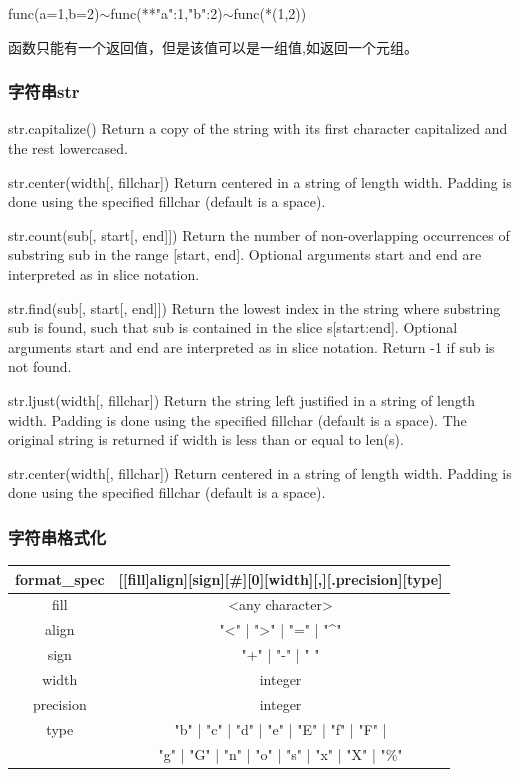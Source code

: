 \documentclass[5pt,a4paper,twocolumn]{article}
\begin{document}
func(a=1,b=2)$\sim$func(**{"a":1,"b":2})$\sim$func(*(1,2))

函数只能有一个返回值，但是该值可以是一组值,如返回一个元组。

\subsubsection*{字符串str}

str.capitalize()
Return a copy of the string with its first character capitalized and the rest lowercased.

str.center(width[, fillchar])
Return centered in a string of length width. Padding is done using the specified fillchar (default is a space).

str.count(sub[, start[, end]])
Return the number of non-overlapping occurrences of substring sub in the range [start, end]. Optional arguments start and end are interpreted as in slice notation.

str.find(sub[, start[, end]])
Return the lowest index in the string where substring sub is found, such that sub is contained in the slice s[start:end]. Optional arguments start and end are interpreted as in slice notation. Return -1 if sub is not found.

str.ljust(width[, fillchar])
Return the string left justified in a string of length width. Padding is done using the specified fillchar (default is a space). The original string is returned if width is less than or equal to len(s).

str.center(width[, fillchar])
Return centered in a string of length width. Padding is done using the specified fillchar (default is a space).


\subsubsection*{字符串格式化}
\begin{table}[!hbp]
\begin{tabular}{ c c }
format\_spec & [[fill]align][sign][\#][0][width][,][.precision][type]\\
\hline
fill & <any character>\\
\hline
align & "<" | ">" | "=" | "\^{}"\\
\hline
sign & "+" | "-" | " "\\
\hline
width & integer\\
\hline
precision & integer\\
\hline
type & "b" | "c" | "d" | "e" | "E" | "f" | "F" |\\
&"g" | "G" | "n" | "o" | "s" | "x" | "X" | "\%"\\
\hline

\end{tabular}
\end{table}
\end{document}
